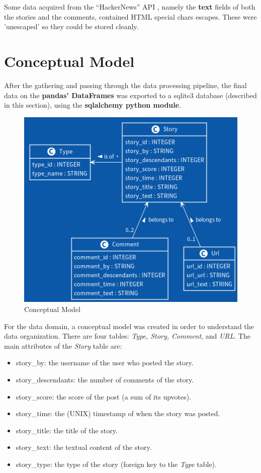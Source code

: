 \documentclass[sigconf]{acmart}
\begin{document}
Some data acquired from the ``HackerNews'' API \cite{API},
namely the \textbf{text} fields of both the stories and the
comments, contained HTML special chars escapes. These were
'unescaped' so they could be stored cleanly.

\section{Conceptual Model}
\label{sec:conceptual_model}
After the gathering and passing through the data processing
pipeline, the final data on the \textbf{pandas' DataFrames}
was exported to a sqlite3 database (described in this section),
using the \textbf{sqlalchemy python module}.

\begin{figure}[htb!]
   \centering
   \includegraphics[scale=0.4]{fig/database.png}
    \caption{Conceptual Model}
    \label{fig:database}
\end{figure}

For the data domain, a conceptual model was created in order to 
understand the data organization. There are four tables: 
\textit{Type, Story, Comment}, and \textit{URL}. The main 
attributes of the \textit{Story} table are: 
\begin{itemize}
    \item story\_by: the username of the user who posted the story.
    \item story\_descendants: the number of comments of the story.
    \item story\_score: the score of the post (a sum of its upvotes).
    \item story\_time: the (UNIX) timestamp of when the story was posted.
    \item story\_title: the title of the story.
    \item story\_text: the textual content of the story.
    \item story\_type: the type of the story (foreign key to the \textit{Type} table). 
\end{itemize}
\end{document}
